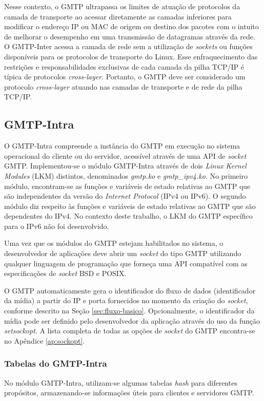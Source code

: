 Nesse contexto, o GMTP ultrapassa os limites de atuação de protocolos da camada de transporte ao acessar diretamente as camadas inferiores para modificar o endereço IP ou MAC de origem ou destino dos pacotes com o intuito de melhorar o desempenho em uma transmissão de datagramas através da rede. 
O GMTP-Inter acessa a camada de rede sem a utilização de \textit{sockets} ou funções disponíveis para os protocolos de transporte do Linux.
Esse enfraquecimento das restrições e responsabilidades exclusivas de cada camada da pilha TCP/IP é típica de protocolos \textit{cross-layer}.
Portanto, o GMTP deve ser considerado um protocolo \textit{cross-layer} atuando nas camadas de transporte e de rede da pilha TCP/IP.

\subsection{GMTP-Intra}
\label{sec:intra}

O GMTP-Intra compreende a instância do GMTP em execução no sistema operacional do cliente ou do servidor, acessível através de uma API de \textit{socket} GMTP. 
Implementou-se o módulo GMTP-Intra através de dois \textit{Linux Kernel Modules} (LKM) distintos, denominados \textit{gmtp.ko} e \textit{gmtp\_ipv4.ko}.
No primeiro módulo, encontram-se as funções e variáveis de estado relativas ao GMTP que são independentes da versão do \textit{Internet Protocol} (IPv4 ou IPv6). O segundo módulo diz respeito às funções e variáveis de estado relativas ao GMTP que são dependentes do IPv4. No contexto deste trabalho, o LKM do GMTP específico para o IPv6 não foi desenvolvido.

Uma vez que os módulos do GMTP estejam habilitados no sistema, o desenvolvedor de aplicações deve abrir um \textit{socket} do tipo GMTP utilizando qualquer linguagem de programação que forneça uma API compatível com as especificações de \textit{socket} BSD e POSIX.

O GMTP automaticamente gera o identificador do fluxo de dados (identificador da mídia) a partir do IP e porta fornecidos no momento da criação do \textit{socket}, conforme descrito na Seção \ref{sec:fluxo-basico}. Opcionalmente, o identificador da mídia pode ser definido pelo desenvolvedor da aplicação através do uso da função \textit{setsockopt}.
A lista completa de todas as opções de \textit{socket} do GMTP encontra-se no Apêndice \ref{ap:sockopt}.

\subsubsection{Tabelas do GMTP-Intra}
\label{sec:tabelas-intra}
No módulo GMTP-Intra, utilizam-se algumas tabelas \textit{hash} para diferentes propósitos, armazenando-se informações úteis para clientes e servidores GMTP.

